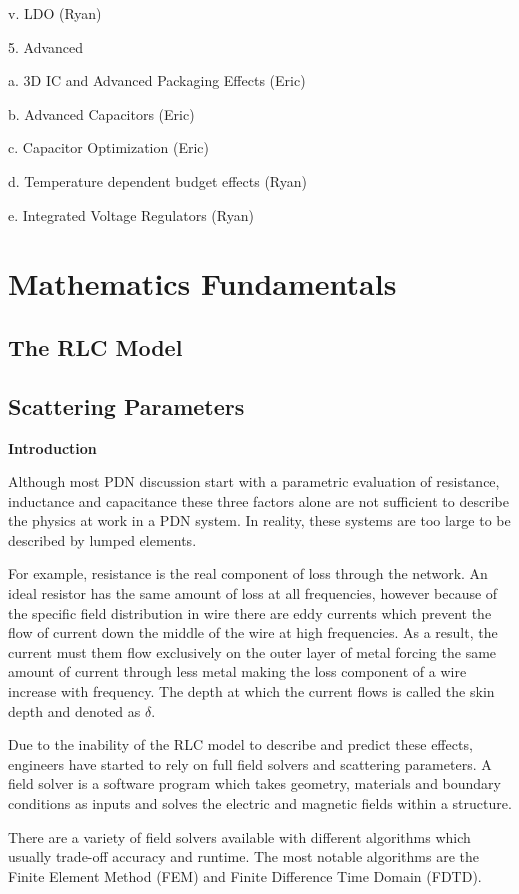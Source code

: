 \documentclass{book}
\begin{document}
v.	LDO (Ryan)

5.	Advanced

a.	3D IC and Advanced Packaging Effects (Eric)

b.	Advanced Capacitors (Eric)

c.	Capacitor Optimization (Eric)

d.	Temperature dependent budget effects (Ryan)

e.	Integrated Voltage Regulators (Ryan)
 
\chapter{Mathematics Fundamentals}
\section{The RLC Model}
\section{Scattering Parameters}

\textbf{Introduction}

Although most PDN discussion start with a parametric evaluation of resistance, inductance and capacitance these three factors alone are not sufficient to describe the physics at work in a PDN system.  In reality, these systems are too large to be described by lumped elements.  

For example, resistance is the real component of loss through the network.  An ideal resistor has the same amount of loss at all frequencies, however because of the specific field distribution in wire there are eddy currents which prevent the flow of current down the middle of the wire at high frequencies.  As a result, the current must them flow exclusively on the outer layer of metal forcing the same amount of current through less metal making the loss component of a wire increase with frequency.  The depth at which the current flows is called the skin depth and denoted as $\delta$.

Due to the inability of the RLC model to describe and predict these effects, engineers have started to rely on full field solvers and scattering parameters.  A field solver is a software program which takes geometry, materials and boundary conditions as inputs and solves the electric and magnetic fields within a structure.  

There are a variety of field solvers available with different algorithms which usually trade-off accuracy and runtime. The most notable algorithms are the Finite Element Method (FEM) and Finite Difference Time Domain (FDTD). 
\end{document}
